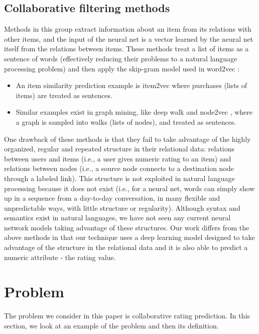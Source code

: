\documentclass[sigconf]{acmart}
\begin{document}
\subsection{Collaborative filtering methods}
Methods in this group extract information about an item from its relations 
with other items, and the input of the neural net is a vector learned by the 
neural net itself from the relations between items.
These methods treat a list of items as a sentence of words 
(effectively reducing their problems to a natural language processing problem)  
and then apply the skip-gram model used in word2vec 
\cite{mikolov2013efficient}:
\begin{itemize}
	\item An item similarity prediction example is item2vec 
	\cite{barkan2016item2vec} where purchases (lists of items) are 
	treated as sentences.
	\item Similar examples exist in graph mining, like deep walk 
	\cite{perozzi2014deepwalk} and node2vec \cite{grovernode2vec}, 
	where a graph is sampled into walks (lists of nodes),
	and treated as sentences.
\end{itemize}
One drawback of these methods is that they fail to take advantage of 
the highly organized, regular and repeated structure in their relational data: 
relations between users and items (i.e., a user gives numeric rating to an 
item) and relations between nodes (i.e., a source node connects to a 
destination node through a labeled link).
This structure is not exploited in natural language processing because it 
does not exist (i.e., for a neural net, words can simply show up in a sequence 
from a day-to-day conversation, in many flexible and unpredictable ways, with 
little structure or regularity).
Although syntax and semantics exist in natural languages, we have not seen any 
current neural network models taking advantage of these structures.
Our work differs from the above methods in that our technique uses a 
deep learning model designed to take advantage of the structure in the 
relational data and it is also able to predict a numeric attribute - the rating 
value.

\section{Problem}
The problem we consider in this paper is collaborative rating prediction.
In this section, we look at an example of the problem and then its definition.
\end{document}
